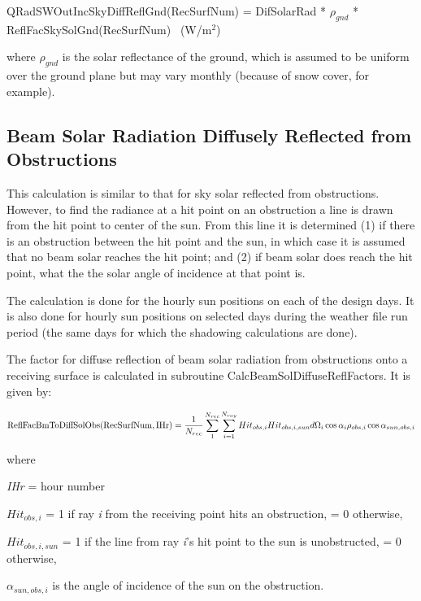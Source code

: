QRadSWOutIncSkyDiffReflGnd(RecSurfNum) = DifSolarRad * \({\rho_{gnd}}\) * ReflFacSkySolGnd(RecSurfNum)~ (W/m\(^{2}\))

where \({\rho_{gnd}}\) is the solar reflectance of the ground, which is assumed to be uniform over the ground plane but may vary monthly (because of snow cover, for example).

\subsection{Beam Solar Radiation Diffusely Reflected from Obstructions}\label{beam-solar-radiation-diffusely-reflected-from-obstructions}

This calculation is similar to that for sky solar reflected from obstructions. However, to find the radiance at a hit point on an obstruction a line is drawn from the hit point to center of the sun. From this line it is determined (1) if there is an obstruction between the hit point and the sun, in which case it is assumed that no beam solar reaches the hit point; and (2) if beam solar does reach the hit point, what the the solar angle of incidence at that point is.

The calculation is done for the hourly sun positions on each of the design days. It is also done for hourly sun positions on selected days during the weather file run period (the same days for which the shadowing calculations are done).

The factor for diffuse reflection of beam solar radiation from obstructions onto a receiving surface is calculated in subroutine CalcBeamSolDiffuseReflFactors. It is given by:

{\scriptsize
\begin{equation}
{\rm{ReflFacBmToDiffSolObs(RecSurfNum,IHr)}} = \frac{1}{{{N_{rec}}}}\sum\limits_1^{{N_{rec}}} {\sum\limits_{i = 1}^{{N_{ray}}} {Hi{t_{obs,i}}Hi{t_{obs,i,sun}}d{\Omega_i}\cos {\alpha_i}{\rho_{obs,i}}\cos {\alpha_{sun,obs,i}}} }
\end{equation}}

where

\emph{IHr} = hour number

\(Hi{t_{obs,i}}\) = 1 if ray \emph{i} from the receiving point hits an obstruction, = 0 otherwise,

\(Hi{t_{obs,i,sun}}\) = 1 if the line from ray \emph{i}'s hit point to the sun is unobstructed, = 0 otherwise,

\({\alpha_{sun,obs,i}}\) is the angle of incidence of the sun on the obstruction.

